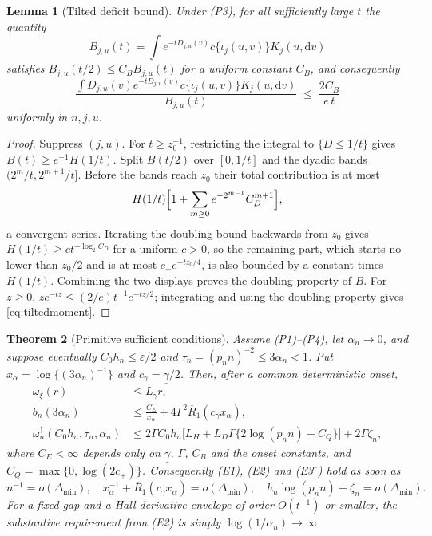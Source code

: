 \documentclass[bj,authoryear]{imsart}
\theoremstyle{plain}
\newtheorem{theorem}{Theorem}[section]
\newtheorem{lemma}[theorem]{Lemma}
\begin{document}
\begin{appendix}
\begin{lemma}[Tilted deficit bound]\label{lem:app-tilted}
Under (P3), for all sufficiently large $t$ the quantity
\[
 B_{j,u}(t)=\int e^{-tD_{j,u}(v)}c\{\iota_j(u,v)\}K_j(u,\mathrm dv)
\]
satisfies $B_{j,u}(t/2)\le C_BB_{j,u}(t)$ for a uniform constant $C_B$,
and consequently
\begin{equation}\label{eq:tiltedmoment}
 \frac{\int D_{j,u}(v)e^{-tD_{j,u}(v)}c\{\iota_j(u,v)\}K_j(u,\mathrm dv)}
      {B_{j,u}(t)}
 \;\le\;\frac{2C_B}{e\,t}
\end{equation}
uniformly in $n,j,u$.
\end{lemma}

\begin{proof}
Suppress $(j,u)$. For $t\ge z_0^{-1}$, restricting the integral to
$\{D\le1/t\}$ gives $B(t)\ge e^{-1}H(1/t)$. Split $B(t/2)$ over
$[0,1/t]$ and the dyadic bands $(2^m/t,2^{m+1}/t]$. Before the bands
reach $z_0$ their total contribution is at most
\[
 H(1/t)\Bigl[1+\sum_{m\ge0}e^{-2^{m-1}}C_D^{m+1}\Bigr],
\]
a convergent series. Iterating the doubling bound backwards from $z_0$
gives $H(1/t)\ge ct^{-\log_2C_D}$ for a uniform $c>0$, so the remaining
part, which starts no lower than $z_0/2$ and is at most
$c_+e^{-tz_0/4}$, is also bounded by a constant times $H(1/t)$.
Combining the two displays proves the doubling property of $B$. For
$z\ge0$, $ze^{-tz}\le(2/e)t^{-1}e^{-tz/2}$; integrating and using the
doubling property gives \eqref{eq:tiltedmoment}.
\end{proof}

\begin{theorem}[Primitive sufficient conditions]\label{thm:app-transfer}
Assume (P1)--(P4), let $\alpha_n\to0$, and suppose eventually
$C_0h_n\le\varepsilon/2$ and $\tau_n=(p_nn)^{-2}\le3\alpha_n<1$. Put
$x_\alpha=\log\{(3\alpha_n)^{-1}\}$ and $c_\gamma=\underline\gamma/2$.
Then, after a common deterministic onset,
\begin{align}
 \omega_\xi(r)&\le L_\gamma r, \label{eq:transfer-E1}\\
 b_n(3\alpha_n)&\le\frac{C_E}{x_\alpha}
 +4\Gamma^2\overline R_1(c_\gamma x_\alpha), \label{eq:transfer-E2}\\
 \omega_n^{\uparrow}(C_0h_n,\tau_n,\alpha_n)
 &\le2\Gamma C_0h_n\bigl[L_H+L_D\Gamma\{2\log(p_nn)+C_Q\}\bigr]
 +2\Gamma\zeta_n, \label{eq:transfer-E3}
\end{align}
where $C_E<\infty$ depends only on $\underline\gamma$, $\Gamma$, $C_B$
and the onset constants, and $C_Q=\max\{0,\log(2c_+)\}$. Consequently
(E1), (E2) and (E3$^\uparrow$) hold as soon as
\begin{equation}\label{eq:transfer-rates}
 n^{-1}=o(\Delta_{\min}),
 \quad
 x_\alpha^{-1}+\overline R_1(c_\gamma x_\alpha)=o(\Delta_{\min}),
 \quad
 h_n\log(p_nn)+\zeta_n=o(\Delta_{\min}).
\end{equation}
For a fixed gap and a Hall derivative envelope of order $O(t^{-1})$ or
smaller, the substantive requirement from (E2) is simply
$\log(1/\alpha_n)\to\infty$.
\end{theorem}


\end{appendix}
\end{document}
